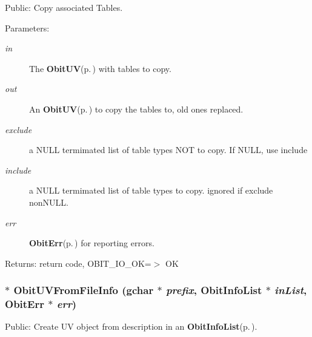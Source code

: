Public: Copy associated Tables. 

\begin{Desc}
\item[Parameters:]
\begin{description}
\item[{\em in}]The {\bf Obit\-UV}{\rm (p.\,\pageref{structObitUV})} with tables to copy. \item[{\em out}]An {\bf Obit\-UV}{\rm (p.\,\pageref{structObitUV})} to copy the tables to, old ones replaced. \item[{\em exclude}]a NULL termimated list of table types NOT to copy. If NULL, use include \item[{\em include}]a NULL termimated list of table types to copy. ignored if exclude non\-NULL. \item[{\em err}]{\bf Obit\-Err}{\rm (p.\,\pageref{structObitErr})} for reporting errors. \end{description}
\end{Desc}
\begin{Desc}
\item[Returns:]return code, OBIT\_\-IO\_\-OK=$>$ OK \end{Desc}
\subsubsection{$\ast$ Obit\-UVFrom\-File\-Info (gchar $\ast$ {\em prefix}, {\bf Obit\-Info\-List} $\ast$ {\em in\-List}, {\bf Obit\-Err} $\ast$ {\em err})}\label{ObitUV_8h_a25}


Public: Create UV object from description in an {\bf Obit\-Info\-List}{\rm (p.\,\pageref{structObitInfoList})}. 

